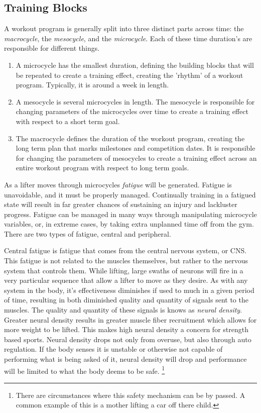 \subsection{Training Blocks}
\label{sec:TrainingBlocks}

A workout program is generally split into three distinct parts across time: the \textit{macrocycle}, the \textit{mesocycle}, and the \textit{microcycle}. Each of these time duration's are responsible for different things.

\begin{enumerate}
	\item A microcycle has the smallest duration, defining the building blocks that will be repeated to create a training effect, creating the 'rhythm' of a workout program. Typically, it is around  a week in length. 
	\item A mesocycle is several microcycles in length. The mesocycle is responsible for changing parameters of the microcycles over time to create a training effect with respect to a short term goal.
	\item The macrocycle defines the duration of the workout program, creating the long term plan that marks milestones and competition dates. It is responsible for changing the parameters of mesocycles to create a training effect across an entire workout program with respect to long term goals.
\end{enumerate}

As a lifter moves through microcycles \textit{fatigue} will be generated. Fatigue is unavoidable, and it must be properly managed. Continually training in a fatigued state will result in far greater chances of sustaining an injury and lackluster progress. \cite{FATIGUE} Fatigue can be managed in many ways through manipulating microcycle variables, or, in extreme cases, by taking extra unplanned time off from the gym. There are two types of fatigue, central and peripheral.\cite{MEASURING_FATIGUE}

Central fatigue is fatigue that comes from the central nervous system, or CNS. This fatigue is not related to the muscles themselves, but rather to the nervous system that controls them. While lifting, large swaths of neurons will fire in a very particular sequence that allow a lifter to move as they desire. As with any system in the body, it's effectiveness diminishes if used to much in a given period of time, resulting in both diminished quality and quantity of signals sent to the muscles. The quality and quantity of these signals is knows as \textit{neural density}. Greater neural density results in greater muscle fiber recruitment which allows for more weight to be lifted. This makes high neural density a concern for strength based sports. Neural density drops not only from overuse, but also through auto regulation. If the body senses it is unstable or otherwise not capable of performing what is being asked of it, neural density will drop and performance will be limited to what the body deems to be safe. \footnote{There are circumstances where this safety mechanism can be by passed. A common example of this is a mother lifting a car off there child.} \cite{MEASURING_FATIGUE}

